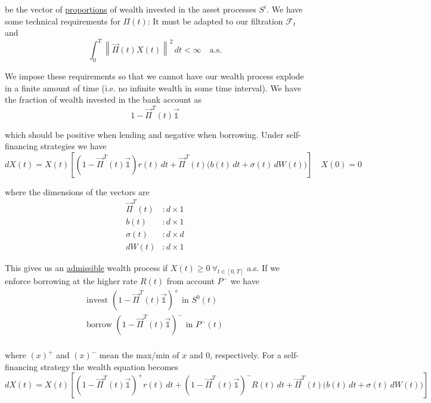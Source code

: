 \documentclass[12pt]{article}
\newcommand\norm[1]{\left\lVert#1\right\rVert} %
\newlength\tindent
\renewcommand{\indent}{\hspace*{\tindent}}
\begin{document}
be the vector of \underline{proportions} of wealth invested in the asset processes $S^i$. We have some technical requirements for $\Pi(t)$: It must be adapted to our filtration $\mathcal F_t$ and
\begin{equation*}
	\int^T_0 \norm{ \vec{\Pi}(t) X(t) }^2\,dt < \infty	\quad \text{a.s.}
\end{equation*}

\indent We impose these requirements so that we cannot have our wealth process explode in a finite amount of time (i.e. no infinite wealth in some time interval). We have the fraction of wealth invested in the bank account as
\begin{equation*}
	1 - \vec{\Pi}^T(t) \mathds {\vec{1}}
\end{equation*}

which should be positive when lending and negative when borrowing. Under self-financing strategies we have
\begin{equation*}
	dX(t) = X(t) \left[ \left( 1 - \vec{\Pi}^T(t) \mathds {\vec{1}} \right)r(t)\,dt + \vec{\Pi}^T(t) \Big( b(t)\,dt + \sigma(t)\,dW(t) \Big) \right] \quad X(0) = 0
\end{equation*}

where the dimensions of the vectors are
\begin{align*}
	\vec{\Pi}^T(t) &: d \times 1 \\
	b(t) &: d \times 1 \\
	\sigma(t) &: d \times d \\
	dW(t) &: d \times 1  
\end{align*}

This gives us an \underline{admissible} wealth process if $X(t) \geq 0~\forall_{t\in[0,T]}$ a.s. If we enforce borrowing at the higher rate $R(t)$ from account $P^-$ we have
\begin{align*}
	\text{invest } \left(  1 - \vec{\Pi}^T(t) \mathds{\vec{1}} \right)^+ \text{ in } S^0(t) \\
	\text{borrow } \left( 1 - \vec{\Pi}^T(t) \mathds{\vec{1}} \right)^- \text{ in } P^-(t) \\
\end{align*}

where $(x)^+$ and $(x)^-$ mean the max/min of $x$ and 0, respectively. For a self-financing strategy the wealth equation becomes
\begin{equation*}
	dX(t) = X(t) \left[ \left(  1 - \vec{\Pi}^T(t) \mathds{\vec{1}} \right)^+ r(t)\,dt + \left(  1 - \vec{\Pi}^T(t) \mathds{\vec{1}} \right)^- R(t)\,dt + \vec{\Pi}^T(t) \Big( b(t)\,dt + \sigma(t)\,dW(t) \Big) \right]
\end{equation*}
\end{document}
